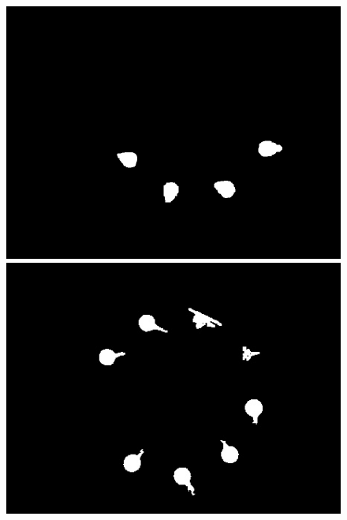 \documentclass[a4paper]{ctexart}
\begin{document}
\begin{enumerate}[label=\arabic*、]
\begin{figure}[htbp]
\begin{minipage}[t]{0.25\textwidth}
			\includegraphics[width=\textwidth]{figure/drop_center/img3.jpg}
		\end{minipage}
		\begin{minipage}[t]{0.25\textwidth}
			\centering
			\includegraphics[width=\textwidth]{figure/drop_center/img4.jpg}
		\end{minipage}
		\begin{minipage}[t]{0.25\textwidth}
			\centering

\end{minipage}
\end{figure}
\end{enumerate}
\end{document}
